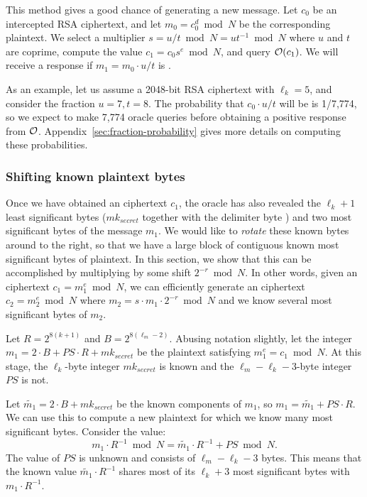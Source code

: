 This method gives a good chance of generating a new \sslconform message. 
Let $c_0$ be an intercepted \tlsconform RSA ciphertext, and let $m_0 = c_0^d \bmod N$ be the \ifext corresponding \fi plaintext.  We select a multiplier $s = u/t \bmod N = u t^{-1} \bmod N$ where $u$ and $t$ are coprime, compute the value $c_1 = c_0 s^e \bmod N$, and query $\mathcal{O}(c_1)$.  We will receive a response if $m_1 = m_0 \cdot u/t$ is \sslconform.  

As an example, let us assume a 2048-bit RSA ciphertext with $\ell_k = 5$, and consider the fraction $u = 7, t = 8$.  The probability that $c_0 \cdot u/t$ will be \sslconform is 1/7,774, so we expect to make 7,774 oracle queries before obtaining a positive response from $\mathcal{O}$. Appendix~\ref{sec:fraction-probability} gives more details on computing these probabilities.

\subsubsection{Shifting known plaintext bytes}
\label{sec:rotations}
Once we have obtained an \sslconform ciphertext $c_1$, the oracle has also revealed the $\ell_k+1$ least significant bytes ($mk_{secret}$ together with the delimiter byte ) and two most significant  bytes of the \sslconform message $m_1$.  We would like to \emph{rotate} these known bytes around to the right, so that we have a large block of contiguous known most significant bytes of plaintext.
In this section, we show that this can be accomplished by multiplying by some shift $2^{-r} \bmod N$.  In other words, given an \sslconform ciphertext $c_1 = m_1^e \bmod N$, we can efficiently generate an \sslconform ciphertext $c_2 = m_2^e \bmod N$ where $m_2 = s \cdot m_1 \cdot 2^{-r} \bmod N$ and we know several most significant bytes of $m_2$. 

Let $R = 2^{8(k+1)}$ and $B = 2^{8(\ell_m-2)}$. Abusing notation slightly, let the integer $m_1 = 2 \cdot B + PS \cdot R + mk_{secret}$ be the plaintext satisfying $m_1^e = c_1 \bmod N$.  At this stage, the $\ell_k$-byte integer $mk_{secret}$ is known and the $\ell_m-\ell_k-3$-byte integer $PS$ is not.

Let $\tilde{m_1} = 2 \cdot B + mk_{secret}$ be the known components of $m_1$, so $m_1 = \tilde{m_1} + PS \cdot R$. We can use this to compute a new plaintext for which we know many most significant bytes.  Consider the value:
\[
m_1 \cdot R^{-1} \bmod N = \tilde{m_1} \cdot R^{-1} + PS \bmod N.
\]
The value of $PS$ is unknown and consists of $\ell_m-\ell_k-3$ bytes.  This means that the known value $\tilde{m_1} \cdot R^{-1}$ shares most of its $\ell_k+3$ most significant bytes with $m_1 \cdot R^{-1}$.

